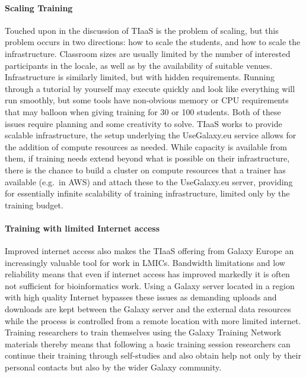 \documentclass[10pt,letterpaper]{article}
\begin{document}
\paragraph*{Scaling Training}
Touched upon in the discussion of TIaaS is the problem of scaling, but this problem occurs in two directions: how to scale the students, and how to scale the infrastructure.
Classroom sizes are usually limited by the number of interested participants in the locale, as well as by the availability of suitable venues.
Infrastructure is similarly limited, but with hidden requirements. Running through a tutorial by yourself may execute quickly and look like everything will run smoothly, but some tools have non-obvious memory or CPU requirements that may balloon when giving training for 30 or 100 students.
Both of these issues require planning and some creativity to solve.
TIaaS works to provide scalable infrastructure, the setup underlying the UseGalaxy.eu service allows for the addition of compute resources as needed.
While capacity is available from them, if training needs extend beyond what is possible on their infrastructure, there is the chance to build a cluster on compute resources that a trainer has available (e.g.\ in AWS) and attach these to the UseGalaxy.eu server, providing for essentially infinite scalability of training infrastructure, limited only by the training budget.

\paragraph*{Training with limited Internet access}
Improved internet access also makes the TIaaS offering from Galaxy Europe an increasingly valuable tool for work in LMICs.
Bandwidth limitations and low reliability means that even if internet access has improved markedly it is often not sufficient for bioinformatics work.
Using a Galaxy server located in a region with high quality Internet bypasses these issues as demanding uploads and downloads are kept between the Galaxy server and the external data resources while the process is controlled from a remote location with more limited internet. %
Training researchers to train themselves using the Galaxy Training Network materials thereby means that following a basic training session researchers can continue their training through self-studies and also obtain help not only by their personal contacts but also by the wider Galaxy community.
\end{document}
